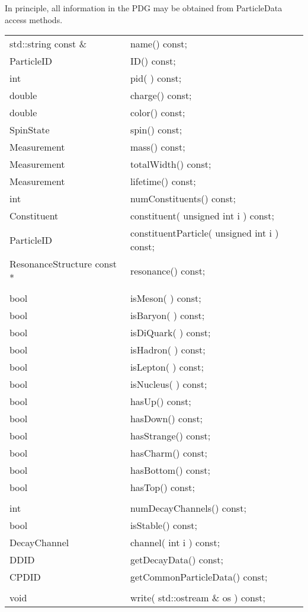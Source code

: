 In principle, all information in the PDG may be obtained from ParticleData
access methods.

\begin{center}
\begin{tabular}{ll}
  std::string const \&         & name()        const;  \\    
  ParticleID                  & ID()          const; \\
  int                         & pid( )        const; \\
  double                      & charge()      const; \\
  double                      & color()       const; \\
  SpinState                   & spin()        const; \\
  Measurement                 & mass()        const; \\
  Measurement                 & totalWidth()  const; \\
  Measurement                 & lifetime()    const; \\
  int                         & numConstituents() const; \\
   Constituent          & constituent( unsigned int i ) const; \\
   ParticleID           & constituentParticle( unsigned int i ) const; \\
  ResonanceStructure const *  & resonance()   const; \\
 \\
  bool & isMeson( )   const; \\
  bool & isBaryon( )  const; \\
  bool & isDiQuark( ) const; \\
  bool & isHadron( )  const; \\
  bool & isLepton( )  const; \\
  bool & isNucleus( ) const; \\
  bool & hasUp()      const; \\
  bool & hasDown()    const; \\
  bool & hasStrange() const; \\
  bool & hasCharm()   const; \\
  bool & hasBottom()  const; \\
  bool & hasTop()     const; \\
 \\
  int                  & numDecayChannels() const; \\
  bool                 & isStable()         const; \\
  DecayChannel  & channel( int i )    const; \\
  DDID   & getDecayData()            const; \\
  CPDID  & getCommonParticleData()   const; \\
   \\
   void & write( std::ostream \& os ) const; \\
\end{tabular}
\end{center}

